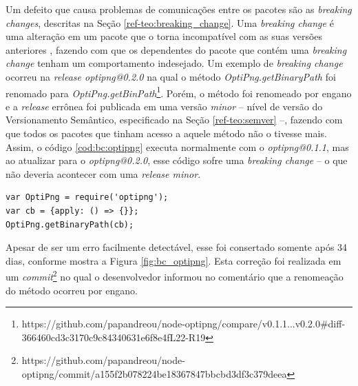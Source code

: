 Um defeito que causa problemas de comunicações entre os pacotes são as \textit{breaking changes}, descritas na Seção \ref{ref-teo:breaking_change}. Uma \textit{breaking change} é uma alteração em um pacote que o torna incompatível com as suas versões anteriores \cite{intro:break_change}, fazendo com que os dependentes do pacote que contém uma \textit{breaking change} tenham um comportamento indesejado. Um exemplo de \textit{breaking change} ocorreu na \textit{release optipng@0.2.0} na qual o método \textit{OptiPng.getBinaryPath} foi renomado para \textit{OptiPng.getBinPath}\footnote{https://github.com/papandreou/node-optipng/compare/v0.1.1...v0.2.0\#diff-366460cd3c3170c9c84340631e6f8e4fL22-R19}. Porém, o método foi renomeado por engano e a \textit{release} errônea foi publicada em uma versão \textit{minor} -- nível de versão do Versionamento Semântico, especificado na Seção \ref{ref-teo:semver} --, fazendo com que todos os pacotes que tinham acesso a aquele método não o tivesse mais. Assim, o código \ref{cod:bc:optipng} executa normalmente com o \textit{optipng@0.1.1}, mas ao atualizar para o \textit{optipng@0.2.0}, esse código sofre uma \textit{breaking change} -- o que não deveria acontecer com uma \textit{release minor}.

\begin{lstlisting}[style=Javascript, label=cod:bc:optipng, caption={Código que sofre \textit{breaking change} do \textit{optipng}}]
var OptiPng = require('optipng');
var cb = {apply: () => {}};
OptiPng.getBinaryPath(cb);
\end{lstlisting}

Apesar de ser um erro facilmente detectável, esse foi consertado somente após 34 dias, conforme mostra a Figura \ref{fig:bc_optipng}. Esta correção foi realizada em um \textit{commit}\footnote{https://github.com/papandreou/node-optipng/commit/a155f2b078224be18367847bbcbd3df3c379deea} no qual o desenvolvedor informou no comentário que a renomeação do método ocorreu por engano.

